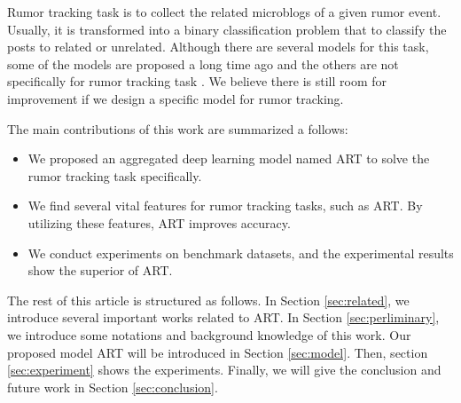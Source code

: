 Rumor tracking task is to collect the related microblogs of a given rumor event. Usually, it is transformed into a binary classification problem that to classify the posts to related or unrelated. Although there are several models for this task, some of the models are proposed a long time ago \cite{DBLP:conf/emnlp/QazvinianRRM11} and the others are not specifically for rumor tracking task \cite{DBLP:conf/www/ChengNB20}.
We believe there is still room for improvement if we design a specific model for rumor tracking. 

The main contributions of this work are summarized a follows:
\begin{itemize}
	\item We proposed an aggregated deep learning model named ART to solve the rumor tracking task specifically.
	\item We find several vital features for rumor tracking tasks, such as ART. By utilizing these features, ART improves accuracy.
	\item We conduct experiments on benchmark datasets, and the experimental results show the superior of ART.
\end{itemize}

The rest of this article is structured as follows. In Section \ref{sec:related}, we introduce several important works related to ART. In Section \ref{sec:perliminary}, we introduce some notations and background knowledge of this work. Our proposed model ART will be introduced in Section \ref{sec:model}. Then, section \ref{sec:experiment} shows the experiments. Finally, we will give the conclusion and future work in Section \ref{sec:conclusion}.